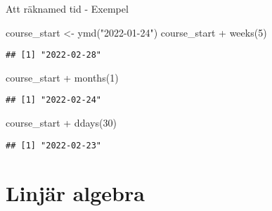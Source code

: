 \documentclass[
  11pt,
  ignorenonframetext,
  handout]{beamer}
\newenvironment{Shaded}{\begin{snugshade}}{\end{snugshade}}
\newcommand{\DecValTok}[1]{\textcolor[rgb]{0.00,0.00,0.81}{#1}}
\newcommand{\FunctionTok}[1]{\textcolor[rgb]{0.00,0.00,0.00}{#1}}
\newcommand{\NormalTok}[1]{#1}
\newcommand{\OtherTok}[1]{\textcolor[rgb]{0.56,0.35,0.01}{#1}}
\newcommand{\SpecialCharTok}[1]{\textcolor[rgb]{0.00,0.00,0.00}{#1}}
\newcommand{\StringTok}[1]{\textcolor[rgb]{0.31,0.60,0.02}{#1}}
\begin{document}
\begin{frame}[fragile]{Att räknamed tid - Exempel}
\protect\hypertarget{att-ruxe4knamed-tid---exempel}{}
\begin{Shaded}
\begin{Highlighting}[]
\NormalTok{course\_start }\OtherTok{\textless{}{-}} \FunctionTok{ymd}\NormalTok{(}\StringTok{"2022{-}01{-}24"}\NormalTok{)}
\NormalTok{course\_start }\SpecialCharTok{+} \FunctionTok{weeks}\NormalTok{(}\DecValTok{5}\NormalTok{)}
\end{Highlighting}
\end{Shaded}

\begin{verbatim}
## [1] "2022-02-28"
\end{verbatim}

\begin{Shaded}
\begin{Highlighting}[]
\NormalTok{course\_start }\SpecialCharTok{+} \FunctionTok{months}\NormalTok{(}\DecValTok{1}\NormalTok{)}
\end{Highlighting}
\end{Shaded}

\begin{verbatim}
## [1] "2022-02-24"
\end{verbatim}

\begin{Shaded}
\begin{Highlighting}[]
\NormalTok{course\_start }\SpecialCharTok{+} \FunctionTok{ddays}\NormalTok{(}\DecValTok{30}\NormalTok{)}
\end{Highlighting}
\end{Shaded}

\begin{verbatim}
## [1] "2022-02-23"
\end{verbatim}
\end{frame}

\hypertarget{linjuxe4r-algebra}{%
\section{Linjär algebra}\label{linjuxe4r-algebra}}
\end{document}
